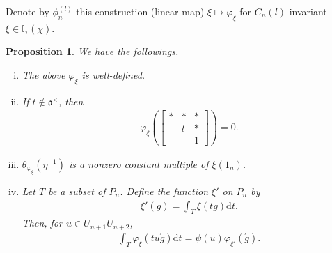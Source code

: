 \documentclass[11pt]{amsart}
\newcommand\vp{\varphi}%
\newcommand\oo{\mathfrak{o}}
\newcommand\dr{\mathrm{d}}
\newcommand\Ib{{\mathbb{I}}}
\newcommand\1{\mathbf{1}}
\newcommand\ac{\acute}
\newcommand\tm{\times}
\numberwithin{equation}{section}
\newtheorem{prop}[thm]{Proposition}
\begin{document}
Denote by $\phi_n^{(l)}$ this construction (linear map) $\xi \mapsto \vp_\xi$
for $C_n(l)$-invariant $\xi \in \Ib_{\tau}(\chi)$. 
 \begin{prop}\label{prop:welldefJW}
 We have the followings.
 \begin{enumerate}[i)]
\item The above $\vp_\xi$ is well-defined.
\item If $t \not\in \oo^\tm$, then
\begin{align*}
\vp_\xi(\begin{bmatrix}
* & * &*  \\
&t & * \\
& & 1
\end{bmatrix}) = 0.
\end{align*} 
\item $\theta_{\vp_\xi}(\eta^{-1})$ is a nonzero constant multiple of $\xi(1_n)$.
\item Let $T$ be a subset of $P_n$.
Define the function $\xi'$ on $P_n$ by
\begin{align*}
\xi'(g) = \int_T \xi(t g) \dr t.
\end{align*} 
Then, for $u \in U_{n+1}U_{n+2}$, 
\begin{align*}
\int_{T} \vp_\xi(t u\ac{g}) \dr t = \psi(u)\vp_{\xi'}(\ac{g}).
\end{align*} 
\end{enumerate}
\end{prop}
\end{document}
